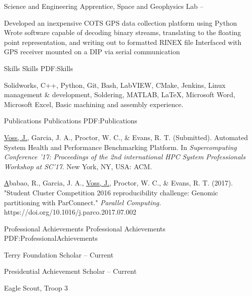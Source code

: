 \documentclass[letterpaper,MMMyyyy,nonstopmode]{simpleresumecv}
\begin{document}
\begin{Body}
\Gap
\BulletItem
Science and Engineering Apprentice, Space and Geophysics Lab
\hfill
{} --
\begin{Detail}
\SubBulletItem
Developed an inexpensive COTS GPS data collection platform using Python
\SubBulletItem
Wrote software capable of decoding binary streams, translating to the floating point \newline
representation, and writing out to formatted RINEX file
\SubBulletItem
Interfaced with GPS receiver mounted on a DIP via serial communication
\end{Detail}



\Section
{Skills}
{Skills}
{PDF:Skills}

\Entry
Solidworks,
C++, 
Python, 
Git, 
Bash,
LabVIEW,
CMake,
Jenkins,
Linux management \& development, 
Soldering,
MATLAB,
\LaTeX,
Microsoft Word,
Microsoft Excel,
Basic machining and assembly experience.


\Section
{Publications}
{Publications}
{PDF:Publications}

\Entry
\underline{Voss, J.}, Garcia, J. A., Proctor, W. C., \& Evans, R. T.
(Submitted). Automated System Health and Performance Benchmarking Platform.
In \textit{Supercomputing Conference ’17: Proceedings of the 2nd international
HPC System Professionals Workshop at SC’17}. New York, NY, USA: ACM.
\Gap

\Entry
\href{https://doi.org/10.1016/j.parco.2017.07.002}
Ababao, R., Garcia, J. A., \underline{Voss, J.}, Proctor, W. C., \& Evans, R. T. (2017). "Student Cluster Competition 2016 reproducibility challenge: Genomic partitioning with ParConnect." \textit{Parallel Computing.} https://doi.org/10.1016/j.parco.2017.07.002


\Section
{Professional Achievements}
{Professional Achievements}
{PDF:ProfessionalAchievements}

\Entry
Terry Foundation Scholar
\hfill
{}--
Current

\Entry
Presidential Achievement Scholar
\hfill
{}--
Current

\Entry
Eagle Scout, Troop 3
\hfill
{}

\end{Body}
\end{document}
